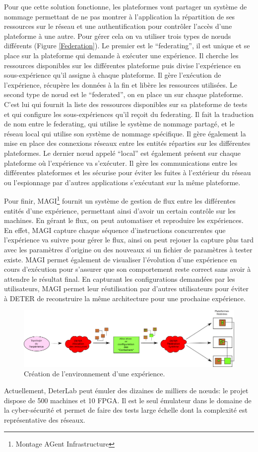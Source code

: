 Pour que cette solution fonctionne, les plateformes vont partager un système de
nommage permettant de ne pas montrer à l'application la répartition de ses
ressources sur le réseau et une authentification pour contrôler l'accès d'une
plateforme à une autre. Pour gérer cela on va utiliser trois types de n\oe uds
différents (Figure \ref{Federation}). Le premier est le ``federating'', il est
unique et se place sur la plateforme qui demande à exécuter une expérience. Il
cherche les ressources disponibles sur les différentes plateforme puis divise
l'expérience en sous-expérience qu'il assigne à chaque plateforme. Il gère
l'exécution de l'expérience, récupère les données à la fin et
libère les ressources utilisées. Le second type de n\oe ud est le ``federated'',
on en place un sur chaque plateforme. C'est lui qui fournit la liste des
ressources disponibles sur sa plateforme de tests et qui configure les
sous-expériences qu'il reçoit du federating. Il fait la traduction de nom entre
le federating, qui utilise le système de nommage partagé, et le réseau local qui
utilise son système de nommage spécifique.  Il gère également la mise en place
des connexions réseaux entre les entités réparties sur les différentes
plateformes. Le dernier n\oe ud appelé ``local'' est également présent sur
chaque plateforme où l'expérience va s'exécuter. Il gère les communications
entre les différentes plateformes et les sécurise pour éviter les fuites à
l'extérieur du réseau ou l'espionnage par d'autres applications s'exécutant sur
la même plateforme.

Pour finir, MAGI\footnote{Montage AGent Infrastructure} fournit un système de
gestion de flux entre les différentes entités d'une expérience, permettant ainsi
d'avoir un certain contrôle sur les machines. En gérant le flux, on peut
automatiser et reproduire les expériences. En effet, MAGI capture chaque
séquence d'instructions concurrentes que l'expérience va suivre pour gérer le
flux, ainsi on peut rejouer la capture plus tard avec les paramètres d'origine
ou des nouveaux si un fichier de paramètres à tester existe. MAGI permet
également de visualiser l'évolution d'une expérience en cours d'exécution pour
s'assurer que son comportement reste correct sans avoir à attendre le résultat
final. En capturant les configurations demandées par les utilisateurs, MAGI
permet leur réutilisation par d'autres utilisateurs pour éviter à DETER de
reconstruire la même architecture pour une prochaine expérience.

\begin{figure}
\centering
\includegraphics[scale=0.63]{Pictures/png/Deter_fonctionnement_general}
\caption{Création de l'environnement d'une expérience.}
\label{Deter_fonc}
\end{figure}

 Actuellement, DeterLab peut émuler des dizaines de milliers de n\oe uds: le
 projet dispose de 500 machines et 10 FPGA. Il est le seul émulateur dans le
 domaine de la cyber-sécurité et permet de faire des tests large échelle dont la
 complexité est représentative des réseaux.
